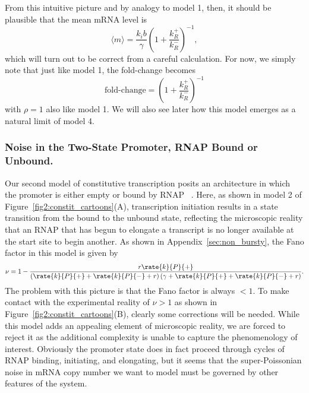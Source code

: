 From this intuitive picture and by analogy to model 1, then, it should be
plausible that the mean mRNA level is
\begin{equation}
\langle m\rangle = \frac{k_i b}{\gamma}
        \left(1 + \frac{k_R^+}{k_R^-}\right)^{-1},
\end{equation}
which will turn out to be correct from a careful calculation. For now, we simply
note that just like model 1, the fold-change becomes
\begin{equation}
\text{fold-change} = \left(1 + \frac{k_R^+}{k_R^-}\right)^{-1}
\end{equation}
with $\rho=1$ also like model 1.
We will also see later how this model emerges as a natural limit of model 4.

\subsubsection{Noise in the Two-State Promoter, RNAP Bound or Unbound.}

Our second model of constitutive transcription posits an architecture in which
the promoter is either empty or bound by RNAP ~\cite{Phillips2015a,
Phillips2019}. Here,  as shown in model 2 of Figure~\ref{fig2:constit_cartoons}(A),
transcription initiation results in a state transition from the bound to the
unbound state, reflecting the microscopic reality that an RNAP that has begun to
elongate a transcript is no longer available at the start site to begin another.
As shown in Appendix~\ref{sec:non_bursty}, the Fano factor in this model is
given by
\begin{align}
    \nu = 1 -
        \frac{r\rate{k}{P}{+}}
            {\left(\rate{k}{P}{+} + \rate{k}{P}{-} + r\right)
             \left(\gamma + \rate{k}{P}{+} + \rate{k}{P}{-} + r\right)}.
\label{eq:model2_fano}
\end{align}
The problem with this picture is that the Fano factor is always $<1$. To make
 contact with the experimental reality of $\nu>1$ as shown in
 Figure~\ref{fig2:constit_cartoons}(B), clearly some corrections will be needed.
 While this model adds an appealing element of microscopic reality, we are
 forced to reject it as the additional complexity is unable to capture the
 phenomenology of interest. Obviously the promoter state does in fact proceed
 through cycles of RNAP binding, initiating, and elongating, but it seems that
 the super-Poissonian noise in mRNA copy number we want to model must be
 governed by other features of the system.

